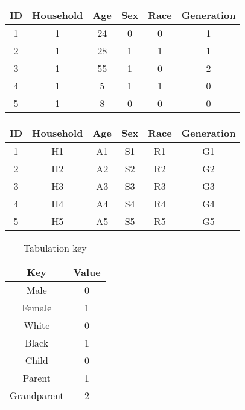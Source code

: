 \documentclass[5p,times,11pt]{elsarticle}
\begin{document}
\begin{table*}[t]

\begin{minipage}[t]{\columnwidth}

\begin{tabular}{c|c|c|c|c|c}
ID & Household & Age & Sex & Race & Generation \\
\hline
1 & 1 & 24 & 0 & 0 & 1  \\
2 & 1 & 28 & 1 & 1 & 1  \\
3 & 1 & 55 & 1 & 0 & 2  \\
4 & 1 & 5 & 1 & 1 & 0  \\
5 & 1 & 8 & 0 & 0 & 0  \\
\hline
\end{tabular}
\caption{Encoded survey responses (Not published)}
\label{resultsencodedsmall}
\end{minipage}
\hspace{\columnsep}
\begin{minipage}[t]{\columnwidth}
\begin{tabular}{c|c|c|c|c|c}
ID & Household & Age & Sex & Race & Generation \\
\hline
1 & H1 & A1 & S1 & R1 & G1  \\
2 & H2 & A2 & S2 & R2 & G2  \\
3 & H3 & A3 & S3 & R3 & G3  \\
4 & H4 & A4 & S4 & R4 & G4  \\
5 & H5 & A5 & S5 & R5 & G5  \\
\hline
\end{tabular}
\caption{DRA unknowns}
\label{unknownssmall}
\end{minipage}

\end{table*}

\begin{table}
\begin{tabular}{c|c}
Key & Value \\
\hline
Male & 0 \\
Female & 1 \\
White & 0 \\
Black & 1 \\
Child & 0 \\
Parent & 1 \\
Grandparent & 2 \\
\hline
\end{tabular}
\caption{Tabulation key}\label{tabulationkey}
\end{table}
\end{document}
